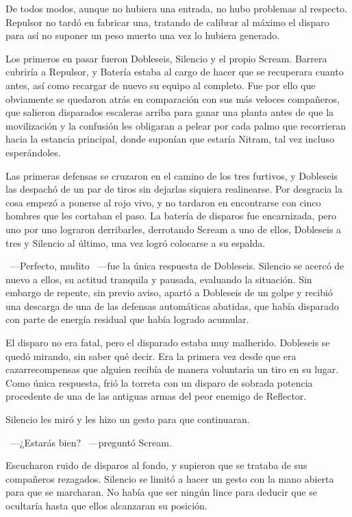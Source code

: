 De todos modos, aunque no hubiera una entrada, no hubo problemas al respecto. Repulsor no tardó en fabricar una, tratando de calibrar al máximo el disparo para así no suponer un peso muerto una vez lo hubiera generado.

Los primeros en pasar fueron Dobleseis, Silencio y el propio Scream. Barrera cubriría a Repulsor, y Batería estaba al cargo de hacer que se recuperara cuanto antes, así como recargar de nuevo su equipo al completo. Fue por ello que obviamente se quedaron atrás en comparación con sus más veloces compañeros, que salieron disparados escaleras arriba para ganar una planta antes de que la movilización y la confusión les obligaran a pelear por cada palmo que recorrieran hacia la estancia principal, donde suponían que estaría Nitram, tal vez incluso esperándoles.

Las primeras defensas se cruzaron en el camino de los tres furtivos, y Dobleseis las despachó de un par de tiros sin dejarlas siquiera realinearse. Por desgracia la cosa empezó a ponerse al rojo vivo, y no tardaron en encontrarse con cinco hombres que les cortaban el paso. La batería de disparos fue encarnizada, pero uno por uno lograron derribarles, derrotando Scream a uno de ellos, Dobleseis a tres y Silencio al último, una vez logró colocarse a su espalda.

~---Perfecto, mudito ~---fue la única respuesta de Dobleseis. Silencio se acercó de nuevo a ellos, su actitud tranquila y pausada, evaluando la situación. Sin embargo de repente, sin previo aviso, apartó a Dobleseis de un golpe y recibió una descarga de una de las defensas automáticas abatidas, que había disparado con parte de energía residual que había logrado acumular.

El disparo no era fatal, pero el disparado estaba muy malherido. Dobleseis se quedó mirando, sin saber qué decir. Era la primera vez desde que era cazarrecompensas que alguien recibía de manera voluntaria un tiro en su lugar. Como única respuesta, frió la torreta con un disparo de sobrada potencia procedente de una de las antiguas armas del peor enemigo de Reflector.

Silencio les miró y les hizo un gesto para que continuaran.

~---¿Estarás bien? ~---preguntó Scream.

Escucharon ruido de disparos al fondo, y supieron que se trataba de sus compañeros rezagados. Silencio se limitó a hacer un gesto con la mano abierta para que se marcharan. No había que ser ningún lince para deducir que se ocultaría hasta que ellos alcanzaran su posición.

